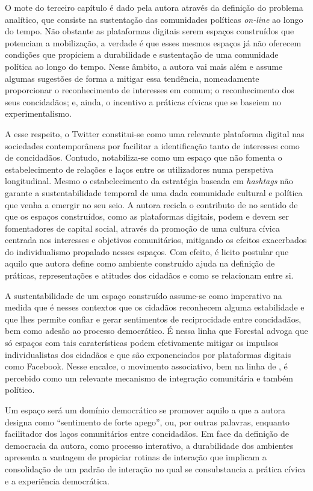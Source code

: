 \documentclass[portuguese]{textolivre}
\begin{document}
O mote do terceiro capítulo é dado pela autora através da definição do problema analítico, que consiste na sustentação das comunidades políticas \textit{on-line} ao longo do tempo. Não obstante as plataformas digitais serem espaços construídos que potenciam a mobilização, a verdade é que esses mesmos espaços já não oferecem condições que propiciem a durabilidade e sustentação de uma comunidade política ao longo do tempo. Nesse âmbito, a autora vai mais além e assume algumas sugestões de forma a mitigar essa tendência, nomeadamente proporcionar o reconhecimento de interesses em comum; o reconhecimento dos seus concidadãos; e, ainda, o incentivo a práticas cívicas que se baseiem no experimentalismo.

A esse respeito, o Twitter constitui-se como uma relevante plataforma digital nas sociedades contemporâneas por facilitar a identificação tanto de interesses como de concidadãos. Contudo, notabiliza-se como um espaço que não fomenta o estabelecimento de relações e laços entre os utilizadores numa perspetiva longitudinal. Mesmo o estabelecimento da estratégia baseada em \textit{hashtags} não garante a sustentabilidade temporal de uma dada comunidade cultural e política que venha a emergir no seu seio. A autora recicla o contributo de \textcite{tocqueville_democracia_2009} no sentido de que os espaços construídos, como as plataformas digitais, podem e devem ser fomentadores de capital social, através da promoção de uma cultura cívica centrada nos interesses e objetivos comunitários, mitigando os efeitos exacerbados do individualismo propalado nesses espaços. Com efeito, é licito postular que aquilo que autora define como ambiente construído ajuda na definição de práticas, representações e atitudes dos cidadãos e como se relacionam entre si.

A sustentabilidade de um espaço construído assume-se como imperativo na medida que é nesses contextos que os cidadãos reconhecem alguma estabilidade e que lhes permite confiar e gerar sentimentos de reciprocidade entre concidadãos, bem como adesão ao processo democrático. É nessa linha que Forestal advoga que só espaços com tais caraterísticas podem efetivamente mitigar os impulsos individualistas dos cidadãos e que são exponenciados por plataformas digitais como Facebook. Nesse encalce, o movimento associativo, bem na linha de \textcite{tocqueville_democracia_2009}, é percebido como um relevante mecanismo de integração comunitária e também político.

Um espaço será um domínio democrático se promover aquilo a que a autora designa como “sentimento de forte apego”, ou, por outras palavras, enquanto facilitador dos laços comunitários entre concidadãos. Em face da definição de democracia da autora, como processo interativo, a durabilidade dos ambientes apresenta a vantagem de propiciar rotinas de interação que implicam a consolidação de um padrão de interação no qual se consubstancia a prática cívica e a experiência democrática.
\end{document}
